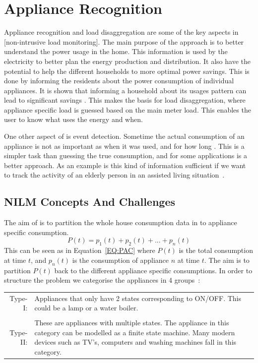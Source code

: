 \chapter{Appliance Recognition }
\label{sec:AppRec}
Appliance recognition and load disaggregation are some of the key aspects in [non-intrusive load monitoring]. The main purpose of the  approach is to better understand the power usage in the home. This information is used by the electricity  to better plan the energy production and distribution. It also have the potential to help the different households to more optimal power savings. This is done by informing the residents about the power consumption of individual appliances. It is shown that informing a household about its usages pattern can lead to significant savings \citep{RefWorks:33}. This makes the basis for load disaggregation, where appliance specific load is guessed based on the main meter load. This enables the user to know what uses the energy and when.

One other aspect of  is event detection. Sometime the actual consumption of an appliance is not as important as when it was used, and for how long \citep{RefWorks:23}. This is a simpler task than guessing the true consumption, and for some applications is a better approach. As an example is this kind of information sufficient if we want to track the activity of an elderly person in an assisted living situation~\citep{RefWorks:47}. 

\section{NILM Concepts And Challenges} 
The aim of  is to partition the whole house consumption data in to appliance specific consumption. 
\begin{equation}
	P(t) = p_1(t) + p_2(t) + ... + p_n(t)
	\label{EQ:PAC}
\end{equation}
This can be seen as in Equation~\ref{EQ:PAC} where $P(t)$ is the total consumption at time $t$, and $p_n(t)$ is the consumption of appliance $n$ at time $t$. The aim is to partition $P(t)$ back to the different appliance specific consumptions. In order to structure the problem we categorise the appliances in 4 groups~\citep{RefWorks:17}: 

\begin{tabularx}{\linewidth}{ r X }
Type-I:&Appliances that only have 2 states corresponding to ON/OFF. This could be a lamp or a water boiler. \\
\\
Type-II:&These are appliances with multiple states. The appliance in this category can be modelled as a finite state machine. Many modern devices such as TV's, computers and washing machines fall in this category.   \\
\end{tabularx}

